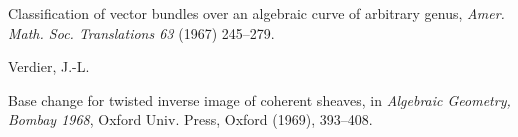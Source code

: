 {\noindent\hangindent=25bp\hspace*{6bp}%
Classification of vector bundles over an algebraic curve of arbitrary genus, \emph{Amer. Math. Soc. Translations 63} (1967) 245--279.\par
\par\vspace{2.15pt}\noindent \hypertarget{bib-482-19}{}Verdier, J.-L.\par
\noindent\hangindent=25bp\hspace*{6bp}%
Base change for twisted inverse image of coherent sheaves, in \emph{Algebraic Geometry, Bombay 1968}, Oxford Univ. Press, Oxford (1969), 393--408.\par
}

